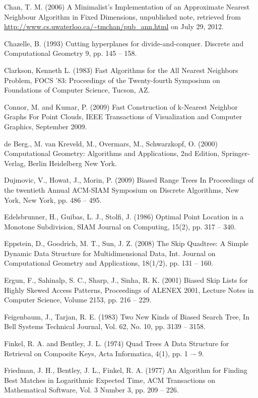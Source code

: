 \documentclass[mcs]{scsthesis}
\begin{document}
\begin{thebibliography}{5}
Chan, T. M. (2006) A Minimalist's Implementation of an Approximate Nearest
Neighbour Algorithm in Fixed Dimensions, unpublished note, retrieved from
\url{http://www.cs.uwaterloo.ca/~tmchan/pub\_ann.html} on July 29, 2012.

 Chazelle, B. (1993) Cutting hyperplanes for divide-and-conquer.
Discrete and Computational Geometry 9, pp. 145 -- 158.

Clarkson, Kenneth L. (1983) Fast Algorithms for the All Nearest Neighbors Problem,
FOCS '83: Proceedings of the Twenty-fourth Symposium on Foundations of
Computer Science, Tucson, AZ. 

Connor, M. and Kumar, P. (2009) Fast Construction of k-Nearest Neighbor Graphs
For Point Clouds, IEEE Transactions of Visualization and Computer Graphics,
September 2009.

de Berg., M. van Kreveld, M., Overmars, M., Schwarzkopf, O. (2000)
Computational Geometry: Algorithms and Applications, 2nd Edition, Springer-Verlag,
Berlin Heidelberg New York.

Dujmovic, V., Howat, J., Morin, P. (2009) Biased Range Trees
In Proceedings of the twentieth Annual ACM-SIAM Symposium on Discrete Algorithms,
New York, New York, pp. 486 -- 495.

Edelsbrunner, H., Guibas, L. J., Stolfi, J. (1986) Optimal Point Location in a
Monotone Subdivision, SIAM Journal on Computing, 15(2), pp. 317 -- 340. 

Eppstein, D., Goodrich, M. T., Sun, J. Z. (2008) The Skip Quadtree: A Simple
Dynamic Data Structure for Multidimensional Data, Int. Journal on Computational
Geometry and Applications, 18(1/2), pp. 131 -- 160.

Ergun, F., Sahinalp, S. C., Sharp, J., Sinha, R. K. (2001) Biased Skip Lists
for Highly Skewed Access Patterns, Proceedings of ALENEX 2001, Lecture Notes in
Computer Science, Volume 2153, pp. 216 -- 229.

Feigenbaum, J., Tarjan, R. E. (1983) Two New Kinds of Biased Search Tree,
In Bell Systems Technical Journal, Vol. 62, No. 10, pp. 3139 -- 3158.

Finkel, R. A. and Bentley, J. L. (1974) Quad Trees A Data Structure for
Retrieval on Composite Keys, Acta Informatica, 4(1), pp. 1 –- 9.

Friedman, J. H., Bentley, J. L., Finkel, R. A. (1977) An Algorithm for Finding
Best Matches in Logarithmic Expected Time, ACM Transactions on Mathematical
Software, Vol. 3 Number 3, pp. 209 -- 226.


\end{thebibliography}
\end{document}

